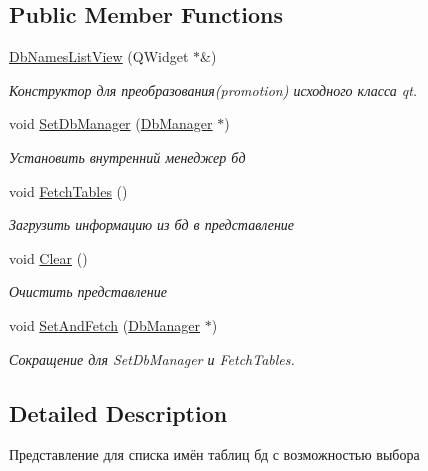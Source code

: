\subsection*{Public Member Functions}
\begin{DoxyCompactItemize}
\item 
\hyperlink{class_db_names_list_view_a9898875686d3f621cf5e2be021e32b3c}{Db\+Names\+List\+View} (Q\+Widget $\ast$\&)
\begin{DoxyCompactList}\small\item\em Конструктор для преобразования(promotion) исходного класса qt. \end{DoxyCompactList}\item 
void \hyperlink{class_db_names_list_view_a323e31a217223ca8819030b455e88539}{Set\+Db\+Manager} (\hyperlink{class_db_manager}{Db\+Manager} $\ast$)
\begin{DoxyCompactList}\small\item\em Установить внутренний менеджер бд \end{DoxyCompactList}\item 
\mbox{\label{class_db_names_list_view_a9c1889b82032cd1001b2fa1505eead11}} 
void \hyperlink{class_db_names_list_view_a9c1889b82032cd1001b2fa1505eead11}{Fetch\+Tables} ()
\begin{DoxyCompactList}\small\item\em Загрузить информацию из бд в представление \end{DoxyCompactList}\item 
\mbox{\label{class_db_names_list_view_a47edbf1349f633347f016d7496a55dab}} 
void \hyperlink{class_db_names_list_view_a47edbf1349f633347f016d7496a55dab}{Clear} ()
\begin{DoxyCompactList}\small\item\em Очистить представление \end{DoxyCompactList}\item 
void \hyperlink{class_db_names_list_view_a14be2f72bf633024312843c43b353927}{Set\+And\+Fetch} (\hyperlink{class_db_manager}{Db\+Manager} $\ast$)
\begin{DoxyCompactList}\small\item\em Сокращение для Set\+Db\+Manager и Fetch\+Tables. \end{DoxyCompactList}\end{DoxyCompactItemize}


\subsection{Detailed Description}
Представление для списка имён таблиц бд с возможностью выбора 

